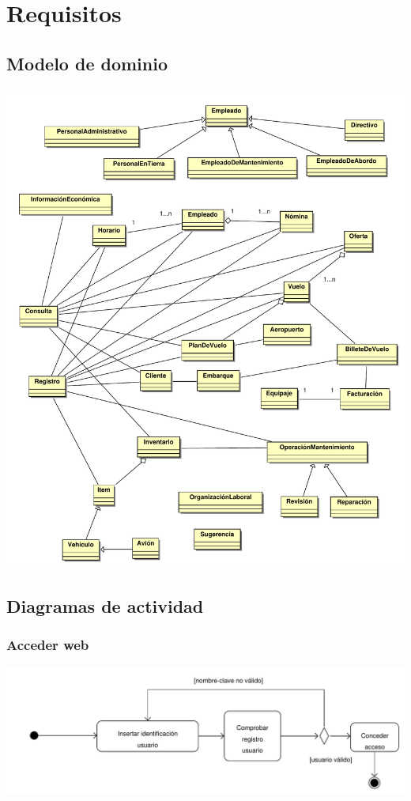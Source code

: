 \documentclass[11pt, a4paper, twoside, titlepage]{article}
\begin{document}
		\vfill
		\eject


	\section{Requisitos}
		\subsection{Modelo de dominio}
				\begin{center}
					\hspace*{-.5cm}
					\includegraphics[scale=.722]{analisis/diagramas/modelodominio.pdf}
				\end{center}	
			\newpage
		\subsection{Diagramas de actividad}
			\subsubsection{Acceder web}
				\begin{center}
					\hspace{-1cm} \includegraphics[scale=.67]{analisis/diagramas/da_accederweb.pdf}
				\end{center}
\end{document}
